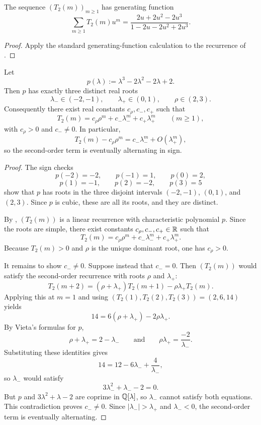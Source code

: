 \begin{corollary}
\label{cor:sigma-generating}
The sequence \((T_2(m))_{m\ge 1}\) has generating function
\[
  \sum_{m\ge 1}T_2(m)u^m
  =
  \frac{2u+2u^2-2u^3}{1-2u-2u^2+2u^3}.
\]
\end{corollary}

\begin{proof}
Apply the standard generating-function calculation to the recurrence of
.
\end{proof}

\begin{theorem}
\label{thm:q2-alternating-second-order}
Let
\[
  p(\lambda):=\lambda^3-2\lambda^2-2\lambda+2.
\]
Then \(p\) has exactly three distinct real roots
\[
  \lambda_-\in(-2,-1),
  \qquad
  \lambda_+\in(0,1),
  \qquad
  \rho\in(2,3).
\]
Consequently there exist real constants \(c_\rho,c_-,c_+\) such that
\[
  T_2(m)=c_\rho\rho^m+c_-\lambda_-^m+c_+\lambda_+^m
  \qquad (m\ge 1),
\]
with \(c_\rho>0\) and \(c_-\neq 0\).  In particular,
\[
  T_2(m)-c_\rho\rho^m
  =
  c_-\lambda_-^m+O(\lambda_+^m),
\]
so the second-order term is eventually alternating in sign.
\end{theorem}

\begin{proof}
The sign checks
\[
  p(-2)=-2,\qquad p(-1)=1,\qquad p(0)=2,
\]
\[
  p(1)=-1,\qquad p(2)=-2,\qquad p(3)=5
\]
show that \(p\) has roots in the three disjoint intervals
\((-2,-1)\), \((0,1)\), and \((2,3)\).  Since \(p\) is cubic, these are all
its roots, and they are distinct.

By , \((T_2(m))\) is a linear recurrence with
characteristic polynomial \(p\).  Since the roots are simple, there exist
constants \(c_\rho,c_-,c_+\in\mathbb{R}\) such that
\[
  T_2(m)=c_\rho\rho^m+c_-\lambda_-^m+c_+\lambda_+^m.
\]
Because \(T_2(m)>0\) and \(\rho\) is the unique dominant root, one has
\(c_\rho>0\).

It remains to show \(c_-\neq 0\).  Suppose instead that \(c_-=0\).  Then
\((T_2(m))\) would satisfy the second-order recurrence with roots \(\rho\) and
\(\lambda_+\):
\[
  T_2(m+2)=(\rho+\lambda_+)T_2(m+1)-\rho\lambda_+T_2(m).
\]
Applying this at \(m=1\) and using \((T_2(1),T_2(2),T_2(3))=(2,6,14)\) yields
\[
  14=6(\rho+\lambda_+)-2\rho\lambda_+.
\]
By Vieta's formulas for \(p\),
\[
  \rho+\lambda_+=2-\lambda_-
  \qquad\text{and}\qquad
  \rho\lambda_+=\frac{-2}{\lambda_-}.
\]
Substituting these identities gives
\[
  14=12-6\lambda_-+\frac{4}{\lambda_-},
\]
so \(\lambda_-\) would satisfy
\[
  3\lambda_-^2+\lambda_--2=0.
\]
But \(p\) and \(3\lambda^2+\lambda-2\) are coprime in \(\mathbb{Q}[\lambda]\), so
\(\lambda_-\) cannot satisfy both equations.  This contradiction proves
\(c_-\neq 0\).  Since \(|\lambda_-|>\lambda_+\) and \(\lambda_-<0\), the
second-order term is eventually alternating.
\end{proof}

